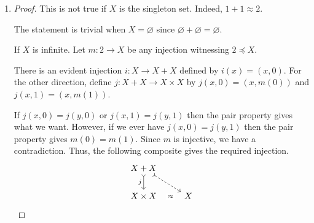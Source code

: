 \documentclass[a4paper]{article}
\newcommand{\To}[3]{#1\colon#2\to#3}
\let\P\relax
\newcommand{\P}{\mathcal{P}}
\begin{document}
\begin{enumerate}
\begin{proof}
    If $X$ is infinite, there is an evident injection $2^{X} \to X^{X}$.
    For the other direction, consider the function $\To{j}{X^{X}}{\P(X \times X)}$ defined by \[j(f) = \{(x,f(x)) \mid x \in X\}.\]
    If $j(f) = j(g)$ then for any $x \in X$, we have $(x,f(x)) = (x,g(x))$, so $f(x) = g(x)$.
    Then functional extensionality implies that $f = g$.
    Thus, the following composition gives the required injection.
    \[\begin{tikzcd}
	{X^{X}} \\
	\\
	{\P(X \times X)} & {\P(X)} & {2^{X}}
	\arrow["j"', tail, from=1-1, to=3-1]
	\arrow[dashed, tail, from=1-1, to=3-3]
	\arrow["\approx"{description}, draw=none, from=3-1, to=3-2]
	\arrow["\approx"{description}, draw=none, from=3-2, to=3-3]
      \end{tikzcd}\]
  \end{proof}
\item
  \begin{proof}
    This is not true if $X$ is the singleton set.
    Indeed, $1 + 1 \approx 2$.
    
    The statement is trivial when $X = \varnothing$ since $\varnothing + \varnothing = \varnothing$.

    If $X$ is infinite.
    Let $\To{m}{2}{X}$ be any injection witnessing $2 \preceq X$.

    There is an evident injection $\To{i}{X}{X+X}$ defined by $i(x) = (x,0)$.
    For the other direction, define $\To{j}{X + X}{X \times X}$ by $j(x,0) = (x,m(0))$ and $j(x,1) = (x,m(1))$.

    If $j(x,0) = j(y,0)$ or $j(x,1) = j(y,1)$ then the pair property gives what we want.
    However, if we ever have $j(x,0) = j(y,1)$ then the pair property gives $m(0) = m(1)$.
    Since $m$ is injective, we have a contradiction.
    Thus, the following composite gives the required injection.
    \[\begin{tikzcd}
	{X + X} \\
	{X \times X} & X
	\arrow["j"', tail, from=1-1, to=2-1]
	\arrow[dashed, tail, from=1-1, to=2-2]
	\arrow["\approx"{description}, draw=none, from=2-1, to=2-2]
      \end{tikzcd}\]
  \end{proof}
\end{enumerate}

\end{document}
